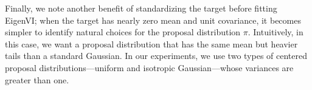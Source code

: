 Finally, we note another benefit of standardizing the target before fitting EigenVI; when the target has nearly zero mean and unit covariance, it becomes simpler to identify natural choices for the proposal distribution $\pi$.
Intuitively, in this case, we want a proposal distribution that has the same mean but heavier tails than a standard Gaussian.
In our experiments, we use two types of centered proposal distributions---uniform and isotropic Gaussian---whose variances are greater than one.


%


